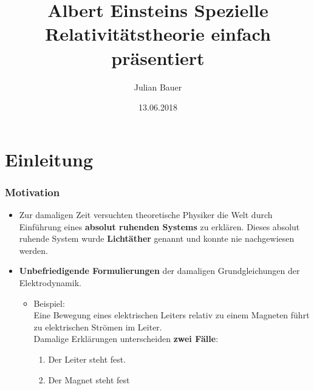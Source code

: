\documentclass[]{beamer}%
\begin{document}
\title{
        Albert Einsteins \glqq{}Spezielle Relativitätstheorie\grqq{} 
        einfach präsentiert
}
\author[Julian Bauer]{
        \begin{tabular}{c} 
                Julian Bauer 
        \end{tabular}
}
\date[]{13.06.2018}

\begin{frame}
    \titlepage
\end{frame}

\begin{frame}
    \tableofcontents
\end{frame}


\section{Einleitung}
\begin{frame}
\end{frame}

\begin{frame}
    \frametitle{Motivation}
    \begin{itemize}
        \item   Zur damaligen Zeit versuchten theoretische Physiker die Welt durch 
                Einführung eines \textbf{absolut ruhenden Systems} zu erklären.
                Dieses absolut ruhende System wurde \textbf{Lichtäther} genannt und
                konnte nie nachgewiesen werden.
                \vspace{10pt}
        \item   \textbf{Unbefriedigende Formulierungen} der damaligen Grundgleichungen 
                der Elektrodynamik.
        \begin{itemize}
            \item   Beispiel:\\
                        Eine Bewegung eines elektrischen Leiters relativ zu einem
                        Magneten führt zu elektrischen Strömen im Leiter.\\
                        Damalige Erklärungen unterscheiden \textbf{zwei Fälle}:
                        \begin{enumerate}
                            \item Der Leiter steht fest.
                            \item Der Magnet steht fest
                        \end{enumerate}
        \end{itemize}
    \end{itemize}
\end{frame}
\end{document}

